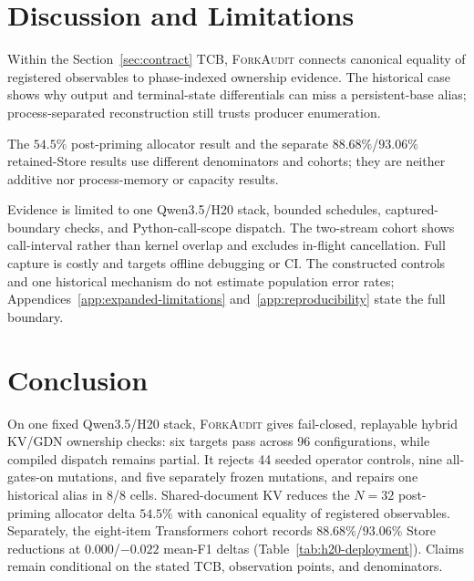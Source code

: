 \documentclass{article}
\newcommand{\method}{\textsc{ForkAudit}}
\begin{document}

\FloatBarrier

\section{Discussion and Limitations}
\label{sec:limitations}

Within the Section~\ref{sec:contract} TCB, \method{} connects canonical
equality of registered observables to phase-indexed ownership evidence.  The
historical case shows why output and terminal-state differentials can miss a
persistent-base alias; process-separated reconstruction still trusts producer
enumeration.

The $54.5\%$ post-priming allocator result and the separate
$88.68\%$/$93.06\%$ retained-Store results use different denominators and
cohorts; they are neither additive nor process-memory or capacity results.

Evidence is limited to one Qwen3.5/H20 stack, bounded schedules,
captured-boundary checks, and Python-call-scope dispatch.  The two-stream cohort
shows call-interval rather than kernel overlap and excludes in-flight
cancellation.  Full capture is costly and targets offline debugging or CI.  The constructed
controls and one historical mechanism do not estimate population error rates;
Appendices~\ref{app:expanded-limitations} and~\ref{app:reproducibility} state
the full boundary.

\section{Conclusion}

On one fixed Qwen3.5/H20 stack, \method{} gives fail-closed, replayable hybrid
KV/GDN ownership checks: six targets pass across 96 configurations, while
compiled dispatch remains partial.  It rejects 44 seeded operator controls,
nine all-gates-on mutations, and five separately frozen mutations, and repairs
one historical alias in 8/8 cells.  Shared-document KV reduces the $N=32$
post-priming allocator delta $54.5\%$ with canonical equality of registered
observables.  Separately, the eight-item Transformers cohort records
$88.68\%$/$93.06\%$ Store reductions at $0.000$/$-0.022$ mean-F1 deltas
(Table~\ref{tab:h20-deployment}).  Claims remain conditional on the stated TCB,
observation points, and denominators.




\appendix
\end{document}

